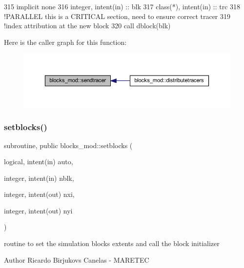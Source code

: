 \begin{DoxyCode}
315     \textcolor{keywordtype}{implicit none}
316     \textcolor{keywordtype}{integer}, \textcolor{keywordtype}{intent(in)} :: blk
317     \textcolor{keywordtype}{class}(*), \textcolor{keywordtype}{intent(in)} :: trc
318     \textcolor{comment}{!PARALLEL this is a CRITICAL section, need to ensure correct tracer}
319     \textcolor{comment}{!index attribution at the new block}
320     \textcolor{keyword}{call }dblock(blk)%
\end{DoxyCode}
Here is the caller graph for this function\+:\nopagebreak
\begin{figure}[H]
\begin{center}
\leavevmode
\includegraphics[width=350pt]{namespaceblocks__mod_a5a9992de40470e417ec8e40e688f6a0e_icgraph}
\end{center}
\end{figure}
\mbox{\label{namespaceblocks__mod_a8f5a5d9e6cfd16cfd1b179092a204696}} 
\subsubsection{\texorpdfstring{setblocks()}{setblocks()}}
{\footnotesize\ttfamily subroutine, public blocks\+\_\+mod\+::setblocks (\begin{DoxyParamCaption}\item[{logical, intent(in)}]{auto,  }\item[{integer, intent(in)}]{nblk,  }\item[{integer, intent(out)}]{nxi,  }\item[{integer, intent(out)}]{nyi }\end{DoxyParamCaption})}



routine to set the simulation blocks extents and call the block initializer 

\begin{DoxyAuthor}{Author}
Ricardo Birjukovs Canelas -\/ M\+A\+R\+E\+T\+EC 
\end{DoxyAuthor}

